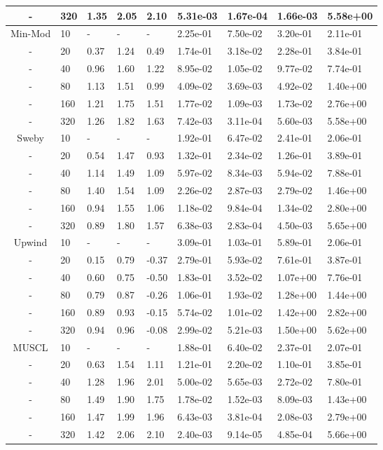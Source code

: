 \begin{table}[p]
{\begin{tabular}{cllllllll}
     - & 320 & 1.35 & 2.05 & 2.10 & 5.31e-03 & 1.67e-04 & 1.66e-03 & 5.58e+00 \\ 
   \hline
        Min-Mod &  10 & - & - & - & 2.25e-01 & 7.50e-02 & 3.20e-01 & 2.11e-01 \\ 
        - &  20 & 0.37 & 1.24 & 0.49 & 1.74e-01 & 3.18e-02 & 2.28e-01 & 3.84e-01 \\ 
        - &  40 & 0.96 & 1.60 & 1.22 & 8.95e-02 & 1.05e-02 & 9.77e-02 & 7.74e-01 \\ 
        - &  80 & 1.13 & 1.51 & 0.99 & 4.09e-02 & 3.69e-03 & 4.92e-02 & 1.40e+00 \\ 
        - & 160 & 1.21 & 1.75 & 1.51 & 1.77e-02 & 1.09e-03 & 1.73e-02 & 2.76e+00 \\ 
        - & 320 & 1.26 & 1.82 & 1.63 & 7.42e-03 & 3.11e-04 & 5.60e-03 & 5.58e+00 \\ 
   \hline
          Sweby &  10 & - & - & - & 1.92e-01 & 6.47e-02 & 2.41e-01 & 2.06e-01 \\ 
          - &  20 & 0.54 & 1.47 & 0.93 & 1.32e-01 & 2.34e-02 & 1.26e-01 & 3.89e-01 \\ 
          - &  40 & 1.14 & 1.49 & 1.09 & 5.97e-02 & 8.34e-03 & 5.94e-02 & 7.88e-01 \\ 
          - &  80 & 1.40 & 1.54 & 1.09 & 2.26e-02 & 2.87e-03 & 2.79e-02 & 1.46e+00 \\ 
          - & 160 & 0.94 & 1.55 & 1.06 & 1.18e-02 & 9.84e-04 & 1.34e-02 & 2.80e+00 \\ 
          - & 320 & 0.89 & 1.80 & 1.57 & 6.38e-03 & 2.83e-04 & 4.50e-03 & 5.65e+00 \\ 
   \hline
         Upwind &  10 & - & - & - & 3.09e-01 & 1.03e-01 & 5.89e-01 & 2.06e-01 \\ 
         - &  20 & 0.15 & 0.79 & -0.37& 2.79e-01 & 5.93e-02 & 7.61e-01 & 3.87e-01 \\ 
         - &  40 & 0.60 & 0.75 & -0.50& 1.83e-01 & 3.52e-02 & 1.07e+00 & 7.76e-01 \\ 
         - &  80 & 0.79 & 0.87 & -0.26& 1.06e-01 & 1.93e-02 & 1.28e+00 & 1.44e+00 \\ 
         - & 160 & 0.89 & 0.93 & -0.15& 5.74e-02 & 1.01e-02 & 1.42e+00 & 2.82e+00 \\ 
         - & 320 & 0.94 & 0.96 & -0.08& 2.99e-02 & 5.21e-03 & 1.50e+00 & 5.62e+00 \\ 
   \hline
          MUSCL &  10 & - & - & - & 1.88e-01 & 6.40e-02 & 2.37e-01 & 2.07e-01 \\ 
          - &  20 & 0.63 & 1.54 & 1.11 & 1.21e-01 & 2.20e-02 & 1.10e-01 & 3.85e-01 \\ 
          - &  40 & 1.28 & 1.96 & 2.01 & 5.00e-02 & 5.65e-03 & 2.72e-02 & 7.80e-01 \\ 
          - &  80 & 1.49 & 1.90 & 1.75 & 1.78e-02 & 1.52e-03 & 8.09e-03 & 1.43e+00 \\ 
          - & 160 & 1.47 & 1.99 & 1.96 & 6.43e-03 & 3.81e-04 & 2.08e-03 & 2.79e+00 \\ 
          - & 320 & 1.42 & 2.06 & 2.10 & 2.40e-03 & 9.14e-05 & 4.85e-04 & 5.66e+00 \\ 
   \hline
   \end{tabular}
   }
\end{table}

